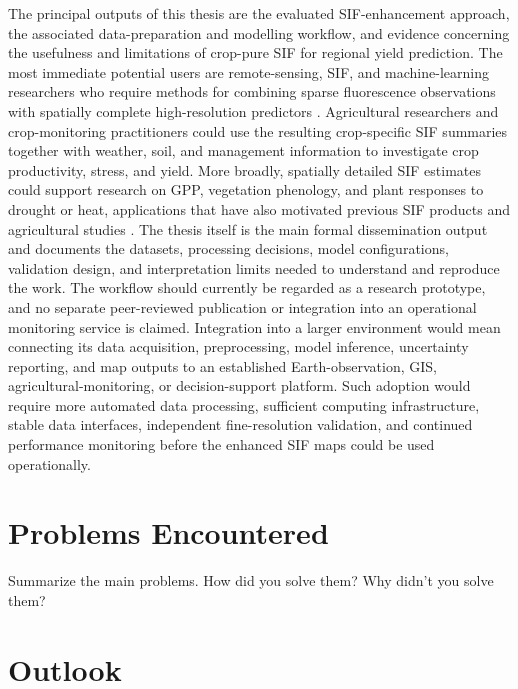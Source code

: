 The principal outputs of this thesis are the evaluated SIF-enhancement approach, the associated data-preparation and modelling workflow, and evidence concerning the usefulness and limitations of crop-pure SIF for regional yield prediction. The most immediate potential users are remote-sensing, SIF, and machine-learning researchers who require methods for combining sparse fluorescence observations with spatially complete high-resolution predictors \cite{li2019global,gensheimer2022convolutional,du2025cnsif}. Agricultural researchers and crop-monitoring practitioners could use the resulting crop-specific SIF summaries together with weather, soil, and management information to investigate crop productivity, stress, and yield. More broadly, spatially detailed SIF estimates could support research on GPP, vegetation phenology, and plant responses to drought or heat, applications that have also motivated previous SIF products and agricultural studies \cite{qiu2022monitoring,song2018satellite,peng2020assessing}. The thesis itself is the main formal dissemination output and documents the datasets, processing decisions, model configurations, validation design, and interpretation limits needed to understand and reproduce the work. The workflow should currently be regarded as a research prototype, and no separate peer-reviewed publication or integration into an operational monitoring service is claimed. Integration into a larger environment would mean connecting its data acquisition, preprocessing, model inference, uncertainty reporting, and map outputs to an established Earth-observation, GIS, agricultural-monitoring, or decision-support platform. Such adoption would require more automated data processing, sufficient computing infrastructure, stable data interfaces, independent fine-resolution validation, and continued performance monitoring before the enhanced SIF maps could be used operationally.

\section{Problems Encountered\label{sec:problems}}

Summarize the main problems. How did you solve them? Why didn't you solve them?

\section{Outlook\label{sec:outlook}}

